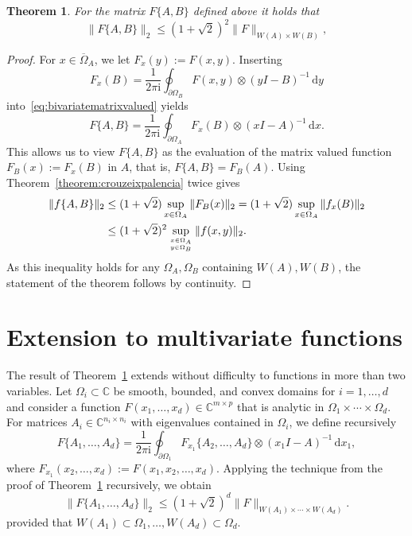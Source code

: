 \documentclass[11pt,a4paper]{amsart}
\newtheorem{theorem}{Theorem}[section]
\newcommand{\C}{{\mathbb C}}
\begin{document}
\begin{theorem}  \label{theorem:main}
For the matrix $F\{A,B\}$ defined above it holds that
\[
 \|F\{A,B\}\|_2 \le (1+\sqrt{2})^2 \|F\|_{W(A)\times W(B)},
\]
\end{theorem}
\begin{proof}
For $x \in \overline{\Omega}_A$, we let $F_x(y):=F(x,y)$. Inserting
\[
 F_x(B) = \frac{1}{2\pi \mathrm{i}} \oint_{\partial \Omega_B} F(x,y) \otimes (yI-B)^{-1}  \,\text{d}y
\]
into~\eqref{eq:bivariatematrixvalued} yields
\[
 F\{A,B\} = \frac{1}{2\pi \mathrm{i}} \oint_{\partial \Omega_A} F_x(B) \otimes (xI-A)^{-1}\,\text{d}x.
\]
This allows us to view $F\{A,B\}$ as the evaluation of the matrix valued function
$F_B(x):=F_x(B)$ in $A$, that is, $F\{A,B\}=F_B(A)$. Using Theorem~\ref{theorem:crouzeixpalencia} twice gives
\begin{align*}
 \|f\{A,B\}\|_2 & \le (1+\sqrt{2}) \sup_{x\in \Omega_A} \|F_B(x)\|_2  = (1+\sqrt{2}) \sup_{x\in \Omega_A} \|f_x(B)\|_2 \\ & \le (1+\sqrt{2})^2 \sup_{x\in \Omega_A \atop y\in \Omega_B} \|f(x,y)\|_2.
\end{align*}
As this inequality holds for any $\Omega_A,\Omega_B$  containing $W(A),W(B)$, the statement of the theorem follows by continuity.
\end{proof}

\section{Extension to multivariate functions} \label{sec:multivariate}


The result of Theorem~\ref{theorem:main} extends without difficulty to functions in more than two variables. Let 
$\Omega_i \subset \C$ be smooth, bounded, and convex domains for $i = 1,\ldots,d$ and consider a function $F(x_1,\ldots,x_d) \in \C^{m\times p}$ that is analytic in  $\Omega_1\times\cdots \times \Omega_d$. For matrices $A_i \in\C^{n_i \times n_i}$ with eigenvalues contained in $\Omega_i$, we define recursively
\[
 F\{A_1,\ldots,A_d\} = \frac{1}{2\pi \mathrm{i}} \oint_{\partial \Omega_1} F_{x_1}\{A_2,\ldots,A_d\} \otimes (x_1 I-A)^{-1}\,\text{d}x_1,
\]
where $F_{x_1}(x_2,\ldots,x_d):=F(x_1,x_2,\ldots,x_d)$. Applying the technique from the proof of Theorem~\ref{theorem:main} recursively, we obtain
\begin{equation} \label{eq:multid}
  \|F\{A_1,\ldots,A_d\}\|_2 \le (1+\sqrt{2})^d \|F\|_{W(A_1) \times \cdots \times W(A_d)}. %
\end{equation}
provided that $W(A_1)\subset \Omega_1, \ldots, W(A_d)\subset \Omega_d$.
\end{document}
